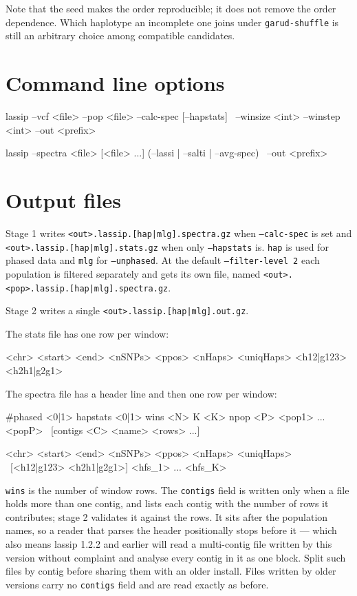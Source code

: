 \documentclass[11pt]{article}
\newcommand{\opt}[1]{\texttt{#1}}
\begin{document}
Note that the seed makes the order reproducible; it does not remove the order
dependence. Which haplotype an incomplete one joins under \opt{garud-shuffle}
is still an arbitrary choice among compatible candidates.

\section{Command line options}
\label{sec:options}

\begin{shell}
lassip --vcf <file> --pop <file> --calc-spec [--hapstats] \
       --winsize <int> --winstep <int> --out <prefix>

lassip --spectra <file> [<file> ...] (--lassi | --salti | --avg-spec) \
       --out <prefix>
\end{shell}



\section{Output files}

Stage 1 writes \texttt{<out>.lassip.[hap|mlg].spectra.gz} when
\opt{--calc-spec} is set and \texttt{<out>.lassip.[hap|mlg].stats.gz} when only
\opt{--hapstats} is. \texttt{hap} is used for phased data and \texttt{mlg} for
\opt{--unphased}. At the default \opt{--filter-level 2} each population is
filtered separately and gets its own file, named
\texttt{<out>.<pop>.lassip.[hap|mlg].spectra.gz}.

Stage 2 writes a single \texttt{<out>.lassip.[hap|mlg].out.gz}.

The stats file has one row per window:

\begin{shell}
<chr> <start> <end> <nSNPs> <ppos> <nHaps> <uniqHaps> <h12|g123> <h2h1|g2g1>
\end{shell}

The spectra file has a header line and then one row per window:

\begin{shell}
#phased <0|1> hapstats <0|1> wins <N> K <K> npop <P> <pop1> ... <popP> \
    [contigs <C> <name> <rows> ...]

<chr> <start> <end> <nSNPs> <ppos> <nHaps> <uniqHaps> \
    [<h12|g123> <h2h1|g2g1>] <hfs_1> ... <hfs_K>
\end{shell}

\texttt{wins} is the number of window rows. The \texttt{contigs} field is
written only when a file holds more than one contig, and lists each contig with
the number of rows it contributes; stage 2 validates it against the rows. It
sits after the population names, so a reader that parses the header
positionally stops before it --- which also means lassip 1.2.2 and earlier will
read a multi-contig file written by this version without complaint and analyse
every contig in it as one block. Split such files by contig before sharing them
with an older install. Files written by older versions carry no
\texttt{contigs} field and are read exactly as before.
\end{document}
